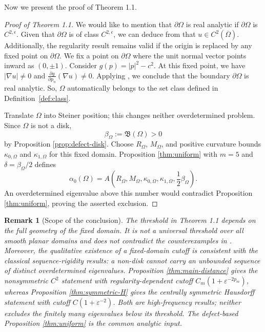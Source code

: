 \documentclass[12pt]{article}
\numberwithin{equation}{section}
\newtheorem{remark}[theorem]{Remark}
\numberwithin{equation}{section}
\begin{document}
Now we present the proof of Theorem 1.1.

\begin{proof}[Proof of Theorem 1.1]
We would like to mention that $\partial \Omega$ is real analytic if $\partial \Omega$ is $C^{2,\epsilon}$.
Given that $\partial \Omega$ is of class $C^{2,\epsilon}$, we can deduce from \cite[Theorem 6.14]{Gilbarg} that $u\in C^2\left(\overline{\Omega}\right)$.
Additionally, the regularity result \cite[Theorem 2]{Kinderlehrer} remains valid if the origin is replaced by any fixed point on $\partial\Omega$.
We fix a point on $\partial\Omega$ where the unit normal vector points inward as $(0,\pm1)$.
Consider $g(p)=|p|^2-c^2$. At this fixed point, we have $\left\vert \nabla u\right\vert \neq0$ and $\frac{\partial g}{\partial p_n}\left(\nabla u\right)\neq0$.
Applying \cite[Theorem 2]{Kinderlehrer}, we conclude that the boundary $\partial \Omega$ is real analytic. So, $\Omega$ automatically belongs to the set class defined in Definition~\ref{def:class}.

Translate $\Omega$ into Steiner position; this changes neither
overdetermined problem. Since $\Omega$ is not a disk,
\[
\beta_\Omega:=\mathfrak B(\Omega)>0
\]
by Proposition \ref{prop:defect-disk}.
Choose $R_\Omega$, $M_\Omega$, and positive curvature bounds
$\kappa_{0,\Omega}$ and $\kappa_{1,\Omega}$ for this fixed domain.
Proposition \ref{thm:uniform} with $m=5$ and
$\delta=\beta_\Omega/2$ defines
\begin{equation*}\label{eq:alpha0}
\alpha_0(\Omega)
=A\left(
R_\Omega,M_\Omega,
\kappa_{0,\Omega},\kappa_{1,\Omega},
\frac12\beta_\Omega
\right).
\end{equation*}
An overdetermined eigenvalue above this number would contradict Proposition
\ref{thm:uniform}, proving the asserted exclusion.
\end{proof}

\begin{remark}[Scope of the conclusion]\label{rem:scope}
\emph{The threshold in Theorem 1.1 depends on the full geometry of
the fixed domain. It is not a universal threshold over all smooth planar
domains and does not contradict the counterexamples in
\cite{ColbrookStepaniants,CaoDeDios}. Moreover, the qualitative existence of
a fixed-domain cutoff is consistent with the classical sequence-rigidity
results: a non-disk cannot carry an unbounded sequence of distinct
overdetermined eigenvalues. Proposition \ref{thm:main-distance} gives the
nonsymmetric $C^2$ statement with regularity-dependent cutoff
$C_m(1+\varepsilon^{-2p_m})$, whereas Proposition \ref{thm:symmetric-H} gives the
centrally symmetric Hausdorff statement with cutoff
$C(1+\varepsilon^{-2})$. Both are high-frequency results; neither excludes
the finitely many eigenvalues below its threshold. The defect-based
Proposition \ref{thm:uniform} is the common analytic input.}
\end{remark}
\end{document}
